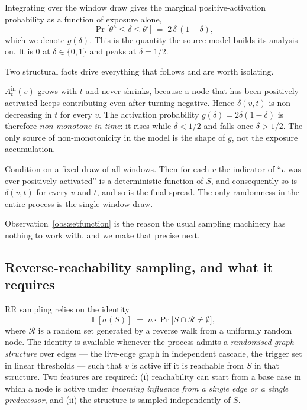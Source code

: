 \begin{remark}
\label{rem:lemma1}
Integrating over the window draw gives the marginal positive-activation probability as a
function of exposure alone,
\begin{equation}
  \Pr\bigl[\theta^\kappa \le \delta \le \theta^\tau\bigr] \;=\; 2\,\delta\,(1-\delta),
  \label{eq:g}
\end{equation}
which we denote $g(\delta)$. This is the quantity the source model builds its analysis on. It is
$0$ at $\delta \in \{0,1\}$ and peaks at $\delta = 1/2$.
\end{remark}

Two structural facts drive everything that follows and are worth isolating.

\begin{observation}
\label{obs:monotone}
$A^{\mathrm{in}}_t(v)$ grows with $t$ and never shrinks, because a node that has been positively
activated keeps contributing even after turning negative. Hence $\delta(v,t)$ is
non-decreasing in $t$ for every $v$. The activation probability $g(\delta) = 2\delta(1-\delta)$ is
therefore \emph{non-monotone in time}: it rises while $\delta < 1/2$ and falls once
$\delta > 1/2$. The only source of non-monotonicity in the model is the shape of $g$, not the
exposure accumulation.
\end{observation}

\begin{observation}
\label{obs:setfunction}
Condition on a fixed draw of all windows. Then for each $v$ the indicator of ``$v$ was ever
positively activated'' is a deterministic function of $S$, and consequently so is
$\delta(v,t)$ for every $v$ and $t$, and so is the final spread. The only randomness in the
entire process is the single window draw.
\end{observation}

Observation~\ref{obs:setfunction} is the reason the usual sampling machinery has nothing to work
with, and we make that precise next.

\subsection{Reverse-reachability sampling, and what it requires}

RR sampling relies on the identity
\begin{equation}
  \mathbb{E}[\sigma(S)] \;=\; n \cdot \Pr\bigl[S \cap \mathcal{R} \neq \emptyset\bigr],
  \label{eq:rr-identity}
\end{equation}
where $\mathcal{R}$ is a random set generated by a reverse walk from a uniformly random node.
The identity is available whenever the process admits a \emph{randomised graph structure} over
edges --- the live-edge graph in independent cascade, the trigger set in linear thresholds ---
such that $v$ is active iff it is reachable from $S$ in that structure. Two features are
required: (i) reachability can start from a base case in which a node is active under
\emph{incoming influence from a single edge or a single predecessor}, and (ii) the structure is
sampled independently of $S$.
